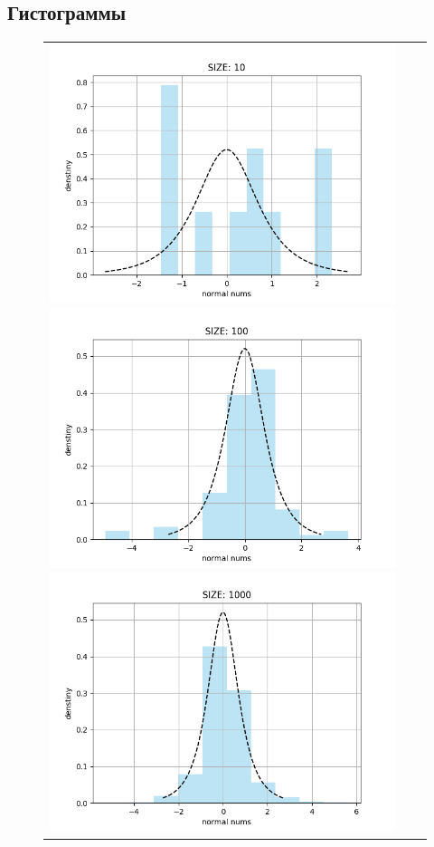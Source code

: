 \subsection{Гистограммы}
\begin{itemize}
	\begin{figure}[H]
		\begin{tabular}{ccc}
			\includegraphics[scale=0.333]{task_1/resource/normal10.png}
			\includegraphics[scale=0.333]{task_1/resource/normal100.png}
			\includegraphics[scale=0.333]{task_1/resource/normal1000.png}

\end{tabular}
\end{figure}
\end{itemize}
